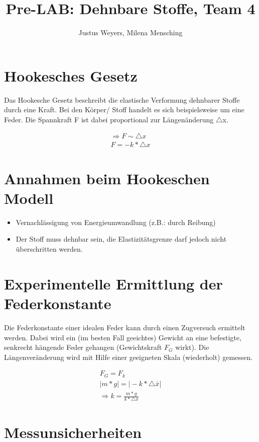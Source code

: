 \documentclass[a4paper, 12pt]{article}
\title{Pre-LAB: Dehnbare Stoffe, Team 4}
\author{Justus Weyers, Milena Mensching}
\begin{document}
\maketitle
\section{Hookesches Gesetz}
Das Hookesche Gesetz beschreibt die elastische Verformung dehnbarer Stoffe durch eine Kraft. Bei den Körper/ Stoff handelt es sich beispielsweise um eine Feder. Die Spannkraft F ist dabei proportional zur Längenänderung $\triangle$x.

\begin{align*}
\Rightarrow F\sim\triangle x\\
F= -k*\triangle x
\end{align*}


\section{Annahmen beim Hookeschen Modell}
\begin{itemize}
\item{Vernachlässigung von Energieumwandlung (z.B.: durch Reibung)}
\item{Der Stoff muss dehnbar sein, die Elastizitätsgrenze darf jedoch nicht überschritten werden.}
\end{itemize}

\section{Experimentelle Ermittlung der Federkonstante}
Die Federkonstante einer idealen Feder kann durch einen Zugversuch ermittelt werden. Dabei wird ein (im besten Fall geeichtes) Gewicht an eine befestigte, senkrecht hängende Feder gehangen (Gewichtskraft $F_G$ wirkt). Die Längenveränderung wird mit Hilfe einer geeigneten Skala (wiederholt) gemessen.

\begin{align*}
F_G = F_k\\
\vert m*g\vert = \vert -k*\triangle \bar{x}\vert\\
\Rightarrow k = \frac{m*g}{k*\triangle \bar{x}} 
\end{align*}


\section{Messunsicherheiten}
\end{document}
